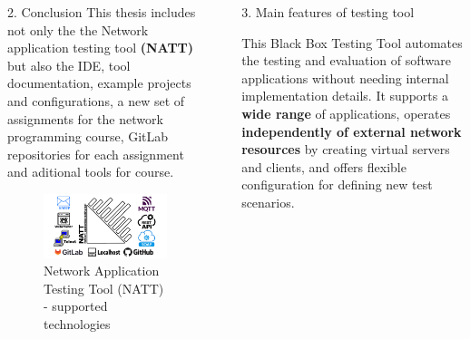 \documentclass[final]{beamer}
\newlength{\sepwidth}
\newlength{\colwidth}
\newcommand{\separatorcolumn}{\begin{column}{\sepwidth}\end{column}}
\begin{document}
\begin{frame}[t]
\begin{columns}[t]
\begin{column}{\colwidth}
\begin{block}{2. Conclusion}
    \hspace{2em}This thesis includes not only the the Network application testing tool \textbf{(NATT)} but also the IDE,
    tool documentation, example projects and configurations, a new set of assignments for the 
    network programming course, GitLab repositories for each assignment and aditional tools for course.

    \begin{figure}
      \centering
        \includegraphics[width=1.0\textwidth]{./imgs/natt-banner-tech.png}
      \caption{Network Application Testing Tool (NATT) - supported technologies} 
    \end{figure}

  \end{block}

\end{column}

\separatorcolumn

\begin{column}{\colwidth}

  \begin{alertblock}{3. Main features of testing tool}

    This Black Box Testing Tool automates the testing and evaluation of software 
    applications without needing internal implementation details. It supports a 
    \textbf{wide range} of applications, operates \textbf{independently of external network resources} 
    by creating virtual servers and clients, and offers flexible configuration for 
    defining new test scenarios.


\end{alertblock}
\end{column}
\end{columns}
\end{frame}
\end{document}
